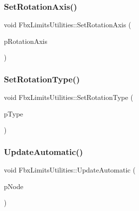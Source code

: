 \mbox{\label{class_fbx_limits_utilities_a851515616b12ed28516c40767dcc96cb}} 
\subsubsection{\texorpdfstring{Set\+Rotation\+Axis()}{SetRotationAxis()}}
{\footnotesize\ttfamily void Fbx\+Limits\+Utilities\+::\+Set\+Rotation\+Axis (\begin{DoxyParamCaption}\item[{\hyperlink{class_fbx_vector4}{Fbx\+Vector4}}]{p\+Rotation\+Axis }\end{DoxyParamCaption})}

\mbox{\label{class_fbx_limits_utilities_ab756ed1a7da36f3fe871c866a5727265}} 
\subsubsection{\texorpdfstring{Set\+Rotation\+Type()}{SetRotationType()}}
{\footnotesize\ttfamily void Fbx\+Limits\+Utilities\+::\+Set\+Rotation\+Type (\begin{DoxyParamCaption}\item[{\hyperlink{class_fbx_limits_utilities_a8c1ec432e195d91eae2548fbc98c8770}{E\+Rotation\+Type}}]{p\+Type }\end{DoxyParamCaption})}

\mbox{\label{class_fbx_limits_utilities_a7f562d759a98f601f8bbb23727506c39}} 
\subsubsection{\texorpdfstring{Update\+Automatic()}{UpdateAutomatic()}}
{\footnotesize\ttfamily void Fbx\+Limits\+Utilities\+::\+Update\+Automatic (\begin{DoxyParamCaption}\item[{\hyperlink{class_fbx_node}{Fbx\+Node} $\ast$}]{p\+Node }\end{DoxyParamCaption})}



